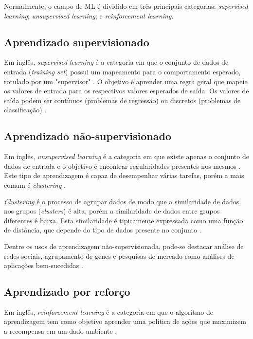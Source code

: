 Normalmente, o campo de ML é dividido em três principais categorias: \textit{supervised learning}; \textit{unsupervised learning}; e \textit{reinforcement learning}.

\subsection{Aprendizado supervisionado}

Em inglês, \textit{supervised learning} é a categoria em que o conjunto de dados de entrada (\textit{training set}) possui um mapeamento para o comportamento esperado, rotulado por um "supervisor" \cite{alpaydin2020introduction}. O objetivo é aprender uma regra geral que mapeie os valores de entrada para os respectivos valores esperados de saída. Os valores de saída podem ser contínuos (problemas de regressão) ou discretos (problemas de classificação) \cite{8527529}.

\subsection{Aprendizado não-supervisionado}

Em inglês, \textit{unsupervised learning} é a categoria em que existe apenas o conjunto de dados de entrada e o objetivo é encontrar regularidades presentes nos mesmos \cite{alpaydin2020introduction}. Este tipo de aprendizagem é capaz de desempenhar várias tarefas, porém a mais comum é \textit{clustering} \cite{8527529}.

\textit{Clustering} é o processo de agrupar dados de modo que a similaridade de dados nos grupos (\textit{clusters}) é alta, porém a similaridade de dados entre grupos diferentes é baixa. Esta similaridade é tipicamente expressada como uma função de distância, que depende do tipo de dados presente no conjunto \cite{8527529}.

Dentre os usos de aprendizagem não-supervisionada, pode-se destacar análise de redes sociais, agrupamento de genes e pesquisas de mercado como análises de aplicações bem-sucedidas \cite{8527529}.

\subsection{Aprendizado por reforço}

Em inglês, \textit{reinforcement learning} é a categoria em que o algoritmo de aprendizagem tem como objetivo aprender uma política de ações que maximizem a recompensa em um dado ambiente \cite{alpaydin2020introduction}.

